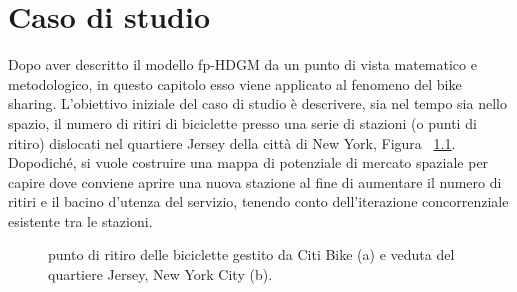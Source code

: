 \chapter[Caso di studio]{Caso di studio}

Dopo aver descritto il modello fp-HDGM da un punto di vista matematico e metodologico, in questo capitolo esso viene applicato al fenomeno del bike sharing. L'obiettivo iniziale del caso di studio è descrivere, sia nel tempo sia nello spazio, il numero di ritiri di biciclette presso una serie di stazioni (o punti di ritiro) dislocati nel quartiere Jersey della città di New York, Figura ~\ref{presentazione_Jersey_City}. Dopodiché, si vuole costruire una mappa di potenziale di mercato spaziale per capire dove conviene aprire una nuova stazione al fine di aumentare il numero di ritiri e il bacino d'utenza del servizio, tenendo conto dell'iterazione concorrenziale esistente tra le stazioni.

\begin{figure}[b!]
	\centering
	\quad
	\quad
	\caption[Punto di ritiro delle biciclette e veduta del quartiere Jersey]{punto di ritiro delle biciclette gestito da Citi Bike (a) e veduta del quartiere Jersey, New York City (b).}
	\label{presentazione_Jersey_City}
\end{figure}

